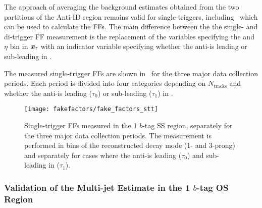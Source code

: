 The approach of averaging the background estimates obtained from the two
partitions of the Anti-ID region remains valid for single-\tauhadvis triggers,
including~ which can be used to calculate the
FFs. The main difference between the the single- and di-\tauhadvis trigger FF
measurement is the replacement of the variables specifying the \pT and $\eta$
bin in $\bm{x}_\tau$ with an indicator variable specifying whether the
anti-\tauhadvis is leading or sub-leading in \pT.


The measured single-\tauhadvis trigger FFs are shown
in~ for the three major data collection periods. Each
period is divided into four categories depending on $N_{\text{tracks}}$ and
whether the anti-\tauhadvis is leading ($\tau_0$) or sub-leading ($\tau_1$) in
\pT.

\begin{figure}[htbp]
  \centering

  \texttt{[image: fakefactors/fake\_factors\_stt]}

  \caption{Single-\tauhadvis trigger FFs measured in the 1 $b$-tag SS region,
    separately for the three major data collection periods. The measurement is
    performed in bins of the reconstructed \tauhadvis decay mode (1- and
    3-prong) and separately for cases where the anti-\tauhadvis is leading
    ($\tau_0$) and sub-leading in \pT ($\tau_1$).}%
  \label{fig:mjfakes_stt_ffs}
\end{figure}


\subsubsection{Validation of the Multi-jet Estimate in the 1 $b$-tag OS Region}

